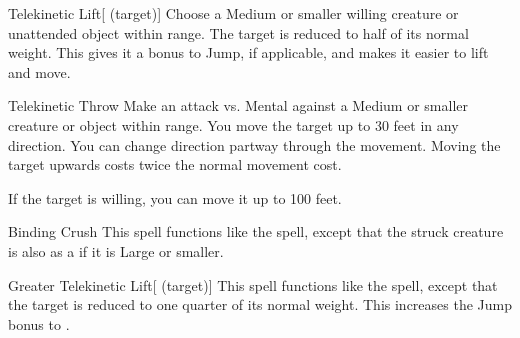 \lowercase{\hypertarget{spell:Telekinetic Lift}{}}\label{spell:Telekinetic Lift}
\begin{attuneability}[\nth{1}]{\hypertarget{spell:Telekinetic Lift}{Telekinetic Lift}}[ (target)]
Choose a Medium or smaller willing creature or unattended object within \rngclose range.
The target is reduced to half of its normal weight.
This gives it a  bonus to Jump, if applicable, and makes it easier to lift and move.
\end{attuneability}
\vspace{0.25em}



\lowercase{\hypertarget{spell:Telekinetic Throw}{}}\label{spell:Telekinetic Throw}
\begin{apability}[\nth{1}]{\hypertarget{spell:Telekinetic Throw}{Telekinetic Throw}}
Make an attack vs. Mental against a Medium or smaller creature or object within \rngmed range.
\hit You move the target up to 30 feet in any direction.
You can change direction partway through the movement.
Moving the target upwards costs twice the normal movement cost.

If the target is willing, you can move it up to 100 feet.
\end{apability}
\vspace{0.25em}



\lowercase{\hypertarget{spell:Binding Crush}{}}\label{spell:Binding Crush}
\begin{apability}[\nth{2}]{\hypertarget{spell:Binding Crush}{Binding Crush}}
This spell functions like the  spell, except that the struck creature is also  as a  if it is Large or smaller.
\end{apability}
\vspace{0.25em}



\lowercase{\hypertarget{spell:Greater Telekinetic Lift}{}}\label{spell:Greater Telekinetic Lift}
\begin{attuneability}[\nth{3}]{\hypertarget{spell:Greater Telekinetic Lift}{Greater Telekinetic Lift}}[ (target)]
This spell functions like the  spell, except that the target is reduced to one quarter of its normal weight.
This increases the Jump bonus to .
\end{attuneability}
\vspace{0.25em}



